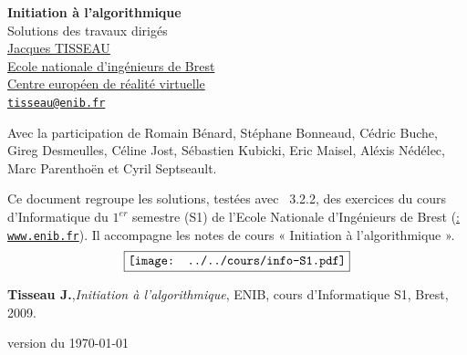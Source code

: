 \documentclass[11pt,a4paper,colorlinks,breaklinks]{book}
\theoremstyle{mybreak}
\begin{document}

\begin{titlepage}
\thispagestyle{fancy}
\setlength{\headheight}{79pt}
\setlength{\footskip}{20pt}
\renewcommand{\headrulewidth}{0pt}
\renewcommand{\footrulewidth}{0pt}

\begin{center}
{\huge\bf Initiation à l'algorithmique}\\[5mm]
{\huge\sc Solutions des travaux dirigés}\\[1cm]
\href{http://www.enib.fr/~tisseau}{\Large\sc Jacques TISSEAU}\\[3mm]
\href{http://www.enib.fr}{Ecole nationale d'ingénieurs de Brest}\\
\href{http://www.cerv.fr}{Centre européen de réalité virtuelle}\\
\href{mailto:tisseau@enib.fr}{\tt tisseau@enib.fr}
\end{center}

{\footnotesize\vspace*{1.5mm}
\noindent Avec la participation de 
{\sc Romain Bénard}, 
{\sc Stéphane Bonneaud}, {\sc Cédric Buche},
{\sc Gireg Desmeulles}, {\sc Céline Jost}, 
{\sc Sébastien Kubicki}, {\sc Eric Maisel}, 
{\sc Aléxis Nédélec}, {\sc Marc Parenthoën} et 
{\sc Cyril Septseault}.
}
\vspace*{1cm}

\noindent Ce document regroupe les solutions, testées avec \python\ 3.2.2,
des exercices du cours d'Infor\-ma\-tique 
du $1^{er}$ semestre (S1) de l'Ecole Nationale d'Ingénieurs 
de Brest (\href{http://www.enib.fr}{\enib : {\tt www.enib.fr}}). Il
accompagne les notes de cours « Initiation à l'algorithmique ».
$$\fbox{\texttt{[image: ../../cours/info-S1.pdf]}}$$
\centerline{\footnotesize
{\bf Tisseau J.},{\em Initiation à l'algorithmique}, ENIB, cours d'Informatique S1, Brest, 2009.
}
\null\vfill

\centerline{\tiny version du \today}
\end{titlepage}
\end{document}
